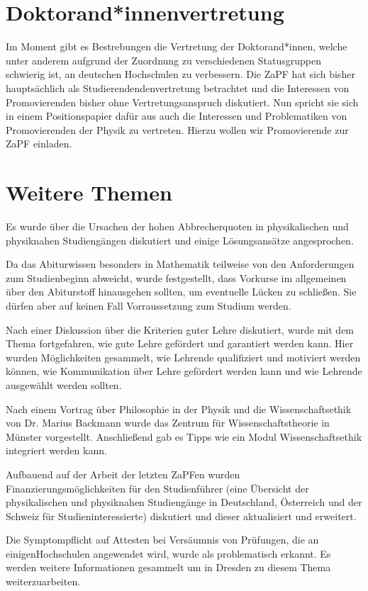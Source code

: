 \section*{Doktorand*innenvertretung}
Im Moment gibt es Bestrebungen die  Vertretung der Doktorand*innen, welche unter anderem aufgrund der Zuordnung zu verschiedenen Statusgruppen schwierig ist, an deutschen Hochschulen zu verbessern.  Die ZaPF hat sich bisher hauptsächlich als Studierendendenvertretung betrachtet und die Interessen von Promovierenden bisher ohne Vertretungsanspruch diskutiert. Nun  spricht sie sich in einem Positionspapier dafür aus auch die Interessen und Problematiken von Promovierenden der Physik zu vertreten.  Hierzu wollen wir Promovierende zur ZaPF einladen.



\section*{Weitere Themen}

Es wurde über die Ursachen der hohen Abbrecherquoten in physikalischen und physiknahen Studiengängen diskutiert und einige Lösungsansätze angesprochen.

Da das Abiturwissen besonders in Mathematik teilweise von den Anforderungen zum Studienbeginn abweicht, wurde festgestellt, dass Vorkurse im allgemeinen über den Abiturstoff hinausgehen sollten, um eventuelle Lücken zu schließen. Sie dürfen aber auf keinen Fall Vorraussetzung zum Studium werden.

Nach einer Diskussion über die Kriterien guter Lehre diskutiert, wurde mit dem Thema fortgefahren, wie gute Lehre gefördert und garantiert werden kann. Hier wurden Möglichkeiten gesammelt, wie Lehrende qualifiziert und motiviert werden können, wie Kommunikation über Lehre gefördert werden kann und wie Lehrende ausgewählt werden sollten.

Nach einem Vortrag über Philosophie in der Physik und die Wissenschaftsethik von Dr. Marius
Backmann wurde das Zentrum für Wissenschaftstheorie in Münster
vorgestellt. Anschließend gab es Tipps wie ein Modul Wissenschaftsethik integriert werden kann.

Aufbauend auf der Arbeit der letzten ZaPFen wurden Finanzierungsmöglichkeiten für den Studienführer (eine Übersicht der physikalischen und physiknahen Studiengänge in Deutschland, Österreich und der Schweiz für Studieninteressierte) diskutiert und dieser aktualisiert und erweitert.

Die Symptompflicht auf Attesten bei Versäumnis von Prüfungen, die an einigenHochschulen angewendet wird, wurde als problematisch erkannt. Es werden weitere Informationen gesammelt um in Dresden zu diesem Thema weiterzuarbeiten.

